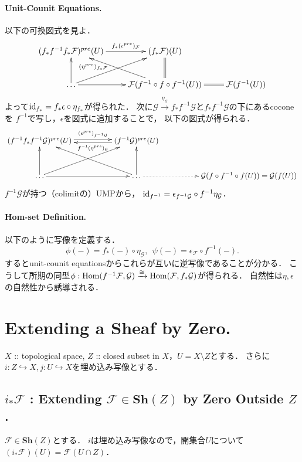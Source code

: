 \documentclass[a4paper]{jsarticle}
\newcommand{\shF}{\mathcal{F}}
\newcommand{\shG}{\mathcal{G}}
\newcommand{\Sh}{\mathbf{Sh}}
\begin{document}
    \paragraph{Unit-Counit Equations.}
    以下の可換図式を見よ．
    \[
    \xymatrix
    {
    (f_* f^{-1} f_* \shF)^{pre}(U) \ar[r]^-{f_* (\epsilon^{pre})_{\shF}} & (f_* \shF)(U) & {} \\
    \dots \ar[u] \ar[ur] \ar[r]
    & \shF(f^{-1} \circ f \circ f^{-1}(U)) \ar[ul]^(0.7){(\eta^{pre})_{f_* \shF}} \ar@{=}[u] \ar@{=}[r]
    & \shF(f^{-1}(U))
    }
    \]
    よって$\mathrm{id}_{f_*}=f_* \epsilon \circ \eta_{f_*}$が得られた．
    次に$\shG \xrightarrow{\eta_{\shG}} f_* f^{-1} \shG$と$f_* f^{-1} \shG$の下にあるcoconeを
    $f^{-1}$で写し，$\epsilon$を図式に追加することで，
    以下の図式が得られる．
    \[
    \xymatrix@C=5em@R=3em
    {
    (f^{-1} f_* f^{-1} \shG)^{pre}(U) \ar@<2pt>[r]^-{(\epsilon^{pre})_{f^{-1}\shG}}
    & (f^{-1} \shG)^{pre}(U) \ar@<2pt>[l]^-{f^{-1}(\eta^{pre})_{\shG}}
    & {} \\
    \dots \ar[u] \ar[ur] \ar[r]
    & \dots \ar[ul] \ar[u] \ar@{..>}[r]
    & \shG(f \circ f^{-1} \circ f(U))=\shG(f(U))
    }
    \]
    $f^{-1} \shG$が持つ（colimitの）UMPから，
    $\id{f^{-1}}=\epsilon_{f^{-1}\shG} \circ f^{-1}\eta_{\shG}$．

    \paragraph{Hom-set Definition.}
    以下のように写像を定義する．
    \[
        \phi(-)=f_*(-) \circ \eta_{\shG},~~
        \psi(-)=\epsilon_{\shF} \circ f^{-1}(-).
    \]
    するとunit-counit equationsからこれらが互いに逆写像であることが分かる．
    こうして所期の同型$\phi: \Hom(f^{-1}\shF, \shG) \bimap \Hom(\shF, f_* \shG)$が得られる．
    自然性は$\eta, \epsilon$の自然性から誘導される．

\section{Extending a Sheaf by Zero.} %
    $X$ :: topological space, $Z$ :: closed subset in $X$，$U=X \setminus Z$とする．
    さらに$i: Z \hookrightarrow X, j: U \hookrightarrow X$を埋め込み写像とする．

    \subsection{$i_* \shF$ : Extending $\shF \in \Sh(Z)$ by Zero Outside $Z$.}
    $\shF \in \Sh(Z)$とする．
    $i$は埋め込み写像なので，開集合$U$について$(i_* \shF)(U)=\shF(U \cap Z)$．
\end{document}
